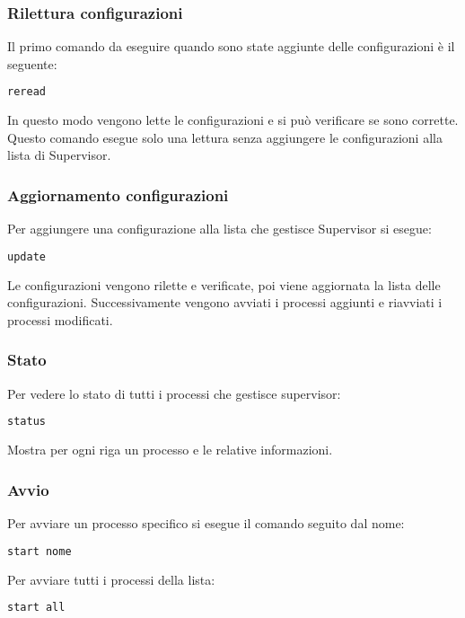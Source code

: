 \subsubsection{Rilettura configurazioni}
\label{subsubsec:client-supervisor-rilettura}
Il primo comando da eseguire quando sono state aggiunte delle configurazioni è il seguente:
\begin{lstlisting}[language=bash]
	reread
\end{lstlisting}
In questo modo vengono lette le configurazioni e si può verificare se sono corrette.
Questo comando esegue solo una lettura senza aggiungere le configurazioni alla lista di Supervisor.

\subsubsection{Aggiornamento configurazioni}
\label{subsubsec:client-supervisor-aggiornamento}
Per aggiungere una configurazione alla lista che gestisce Supervisor si esegue:
\begin{lstlisting}[language=bash]
	update
\end{lstlisting}
Le configurazioni vengono rilette e verificate, poi viene aggiornata la lista delle configurazioni.
Successivamente vengono avviati i processi aggiunti e riavviati i processi modificati.

\subsubsection{Stato}
\label{subsubsec:client-supervisor-stato}
Per vedere lo stato di tutti i processi che gestisce supervisor:
\begin{lstlisting}[language=bash]
	status
\end{lstlisting}
Mostra per ogni riga un processo e le relative informazioni.

\subsubsection{Avvio}
\label{subsubsec:client-supervisor-avvio}
Per avviare un processo specifico si esegue il comando seguito dal nome:
\begin{lstlisting}[language=bash]
	start nome
\end{lstlisting}
Per avviare tutti i processi della lista:
\begin{lstlisting}[language=bash]
	start all
\end{lstlisting}


